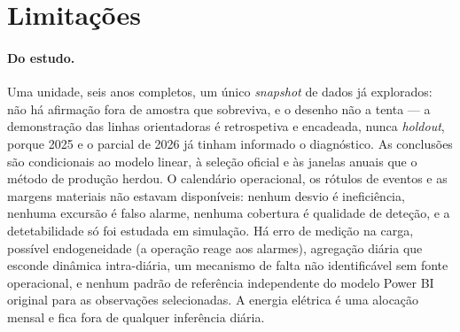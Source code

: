 \section{Limitações}
\label{sec:limitacoes}

\paragraph{Do estudo.} Uma unidade, seis anos completos, um único
\emph{snapshot} de dados já explorados: não há afirmação fora de amostra que
sobreviva, e o desenho não a tenta --- a demonstração das linhas
orientadoras é retrospetiva e encadeada, nunca \emph{holdout}, porque 2025 e
o parcial de 2026 já tinham informado o diagnóstico. As conclusões são
condicionais ao modelo linear, à seleção oficial e às janelas anuais que o
método de produção herdou. O calendário operacional, os rótulos de eventos e
as margens materiais não estavam disponíveis: nenhum desvio é ineficiência,
nenhuma excursão é falso alarme, nenhuma cobertura é qualidade de deteção,
e a detetabilidade só foi estudada em simulação. Há erro de medição na
carga, possível endogeneidade (a operação reage aos alarmes), agregação
diária que esconde dinâmica intra-diária, um mecanismo de falta não
identificável sem fonte operacional, e nenhum padrão de referência
independente do modelo Power BI original para as observações selecionadas.
A energia elétrica é uma alocação mensal e fica fora de qualquer inferência
diária.

